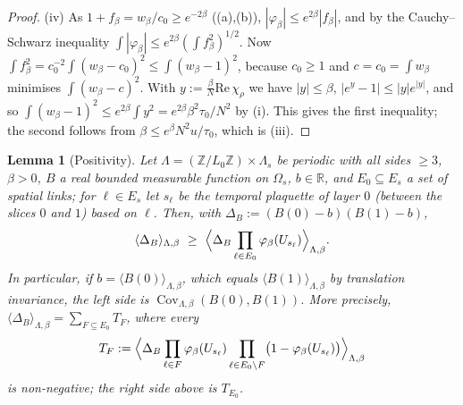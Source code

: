 \documentclass[11pt,a4paper]{article}
\newtheorem{lemma}[theorem]{Lemma}
\theoremstyle{definition}
\theoremstyle{remark}
\DeclareMathOperator{\Cov}{Cov}
\newcommand{\R}{\mathbb{R}}
\newcommand{\Z}{\mathbb{Z}}
\newcommand{\IIIlab}[2]{\cite[#1 \texttt{#2}]{III}}
\begin{document}
\begin{proof}
(iv) As $1+f_\beta=w_\beta/c_0\ge e^{-2\beta}$ (\IIIlab{Lemma}{al:lem:facts}(a),(b)), $|\varphi_\beta|\le e^{2\beta}|f_\beta|$, and by the
Cauchy--Schwarz inequality $\int|\varphi_\beta|\le e^{2\beta}(\int f_\beta^2)^{1/2}$. Now $\int f_\beta^2=c_0^{-2}\int(w_\beta-c_0)^2\le\int(w_\beta-1)^2$,
because $c_0\ge1$ and $c=c_0=\int w_\beta$ minimises $\int(w_\beta-c)^2$. With $y:=\frac\beta N\mathrm{Re}\,\chi_\rho$ we have $|y|\le\beta$,
$|e^y-1|\le|y|e^{|y|}$, and so $\int(w_\beta-1)^2\le e^{2\beta}\int y^2=e^{2\beta}\beta^2\tau_0/N^2$ by (i). This gives the first inequality;
the second follows from $\beta\le e^\beta N^2u/\tau_0$, which is (iii).
\end{proof}

\begin{lemma}[Positivity]\label{mg:lem:pos}
Let $\Lambda=(\Z/L_0\Z)\times\Lambda_s$ be periodic with all sides $\ge3$, $\beta>0$, $B$ a real bounded measurable function on $\Omega_s$, $b\in\R$,
and $E_0\subseteq E_s$ a set of spatial links; for $\ell\in E_s$ let $s_\ell$ be the temporal plaquette of layer $0$ (between the slices $0$ and $1$)
based on $\ell$. Then, with $\Delta_B:=(B(0)-b)(B(1)-b)$,
\[
\langle\Delta_B\rangle_{\Lambda,\beta}\ \ge\ \Bigl\langle\Delta_B\prod_{\ell\in E_0}\varphi_\beta(U_{s_\ell})\Bigr\rangle_{\Lambda,\beta}.
\]
In particular, if $b=\langle B(0)\rangle_{\Lambda,\beta}$, which equals $\langle B(1)\rangle_{\Lambda,\beta}$ by translation invariance, the left side
is $\Cov_{\Lambda,\beta}(B(0),B(1))$. More precisely, $\langle\Delta_B\rangle_{\Lambda,\beta}=\sum_{F\subseteq E_0}T_F$, where every
\[
T_F:=\Bigl\langle\Delta_B\prod_{\ell\in F}\varphi_\beta(U_{s_\ell})\prod_{\ell\in E_0\setminus F}\bigl(1-\varphi_\beta(U_{s_\ell})\bigr)\Bigr\rangle_{\Lambda,\beta}
\]
is non-negative; the right side above is $T_{E_0}$.
\end{lemma}
\end{document}
